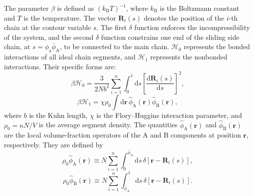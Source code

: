     The parameter $\beta$ is defined as $(k_{\mathrm B}T)^{-1}$, where $k_{\mathrm B}$ is the Boltzmann constant and $T$ is the temperature.
    The vector $\bm{R}_{i}(s)$ denotes the position of the $i$-th chain at the contour variable $s$.
    The first $\delta$ function enforces the incompressibility of the system, and the second $\delta$ function constrains one end of the sliding side chain, at $s=\phi_{\mathrm{a}}\bar{\phi}_{\mathrm{A}}$, to be connected to the main chain.
    $\mathcal{H}_0$ represents the bonded interactions of all ideal chain segments, and $\mathcal{H}_1$ represents the nonbonded interactions.
    Their specific forms are:
    \begin{equation}
        \beta \mathcal{H}_0 = 
        \frac{3}{2 N b^2} 
        \sum_{i=1}^n \int_0^{1} \mathrm{d}s 
        \left[ \frac{\mathrm{d} \bm{R}_{i}(s)}{\mathrm{d}s} \right]^2,
    \end{equation}
    \begin{equation}
        \beta \mathcal{H}_1 = 
        \chi \rho_0 \int \mathrm{d}\bm{r} \, \hat{\phi}_{\mathrm{A}}(\bm{r}) \hat{\phi}_{\mathrm{B}}(\bm{r}),
    \end{equation}
    where $b$ is the Kuhn length, $\chi$ is the Flory--Huggins interaction parameter, and $\rho_0 = nN/V$ is the average segment density.
    The quantities $\hat{\phi}_{\mathrm{A}}(\bm{r})$ and $\hat{\phi}_{\mathrm{B}}(\bm{r})$ are the local volume-fraction operators of the A and B components at position $\bm{r}$, respectively.
    They are defined by
    \begin{equation}
        \rho_0 \hat{\phi}_{\mathrm A}(\bm{r})
        \equiv
        N \sum_{i=1}^n \int_0^{\bar{\phi}_{\mathrm A}} \mathrm{d}s\,
        \delta[\bm{r} - \bm{R}_i(s)],
    \end{equation}
    \begin{equation}
        \rho_0 \hat{\phi}_{\mathrm B}(\bm{r})
        \equiv
        N \sum_{i=1}^n \int_{\bar{\phi}_{\mathrm A}}^{1} \mathrm{d}s\,
        \delta[\bm{r} - \bm{R}_i(s)].
    \end{equation}


